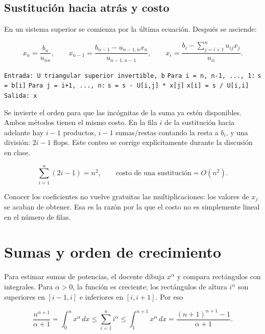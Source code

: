 \documentclass[12pt,a4paper]{article}
\begin{document}
\subsection{Sustitución hacia atrás y costo}

En un sistema superior se comienza por la última ecuación. Después se asciende:

\[
x_n=\frac{b_n}{u_{nn}},\qquad
x_{n-1}=\frac{b_{n-1}-u_{n-1,n}x_n}{u_{n-1,n-1}},\qquad
x_i=\frac{b_i-\sum_{j=i+1}^n u_{ij}x_j}{u_{ii}}.
\]

\begin{algorithm}[H]
\small\DontPrintSemicolon
\hspace*{0.0em}\texttt{Entrada: U triangular superior invertible, b}\;
\hspace*{0.0em}\texttt{Para i = n, n-1, ..., 1:}\;
\hspace*{0.7em}\texttt{s = b[i]}\;
\hspace*{0.7em}\texttt{Para j = i+1, ..., n:}\;
\hspace*{1.4em}\texttt{s = s - U[i,j] * x[j]}\;
\hspace*{0.7em}\texttt{x[i] = s / U[i,i]}\;
\hspace*{0.0em}\texttt{Salida: x}\;
\end{algorithm}

Se invierte el orden para que las incógnitas de la suma ya estén disponibles. Ambos métodos tienen el mismo costo. En la fila $i$ de la sustitución hacia adelante hay $i-1$ productos, $i-1$ sumas/restas contando la resta a $b_i$, y una división: $2i-1$ flops. Este conteo se corrige explícitamente durante la discusión en clase.

\[
\sum_{i=1}^n(2i-1)=n^2,\qquad
\boxed{\text{costo de una sustitución}=O(n^2)}.
\]

Conocer los coeficientes no vuelve gratuitas las multiplicaciones: los valores de $x_j$ se acaban de obtener. Esa es la razón por la que el costo no es simplemente lineal en el número de filas.

\section{Sumas y orden de crecimiento}

Para estimar sumas de potencias, el docente dibuja $x^\alpha$ y compara rectángulos con integrales. Para $\alpha>0$, la función es creciente; los rectángulos de altura $i^\alpha$ son superiores en $[i-1,i]$ e inferiores en $[i,i+1]$. Por eso

\[
\frac{n^{\alpha+1}}{\alpha+1}
=\int_0^n x^\alpha\,dx
\le\sum_{i=1}^n i^\alpha
\le\int_1^{n+1}x^\alpha\,dx
=\frac{(n+1)^{\alpha+1}-1}{\alpha+1}.
\]
\end{document}
